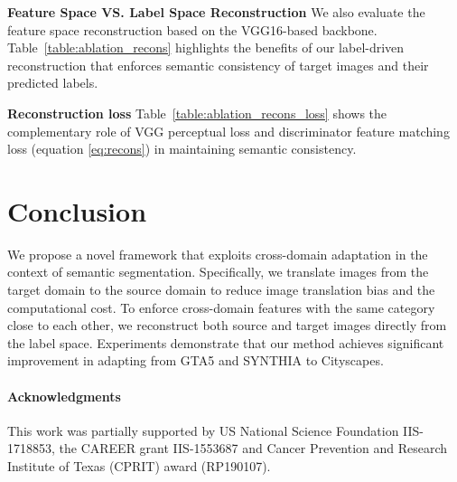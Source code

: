 \documentclass[runningheads]{llncs}
\begin{document}
	{\textbf{Feature Space VS. Label Space Reconstruction}} We also evaluate the feature space reconstruction based on the VGG16-based backbone. Table~\ref{table:ablation_recons} highlights the benefits of our label-driven reconstruction that enforces semantic consistency of target images and their predicted labels.
	
	{\textbf{Reconstruction loss}} Table~\ref{table:ablation_recons_loss} shows the complementary role of VGG perceptual loss and discriminator feature matching loss (equation \ref{eq:recons}) in maintaining semantic consistency.
	
	\iffalse
	\subsubsection{Cross-domain semantic consistency}
	In this section, we investigate the effectiveness of shared-latent space assumption on maintaining cross-domain semantic consistency. As illustrated in Figure~\ref{fig:latent_space}, more semantic information can be preserved by considering both cycle-consistency and shared-latent space assumptions. To assess its importance on overall performance, we also apply our method to target-like images that are obtained by only enforcing cycle-consistency. Our results reveal that cross-domain semantic consistency also dramatically benefits the domain adaptation performance quantitatively (Table~\ref{table:latent_space}). 
	\fi
	
	\section{Conclusion}
	We propose a novel framework that exploits cross-domain adaptation in the context of semantic segmentation. Specifically, we translate images from the target domain to the source domain to reduce image translation bias and the computational cost. To enforce cross-domain features with the same category close to each other, we reconstruct both source and target images directly from the label space. Experiments demonstrate that our method achieves significant improvement in adapting from GTA5 and SYNTHIA to Cityscapes.
	
	\paragraph{\textbf{Acknowledgments}}
	This work was partially supported by US National Science Foundation IIS-1718853, the CAREER grant IIS-1553687 and Cancer Prevention and Research Institute of Texas (CPRIT) award (RP190107).
\clearpage


\end{document}
